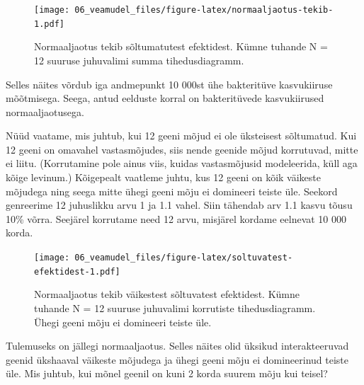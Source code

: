 \documentclass[]{book}
\newenvironment{Shaded}{\begin{snugshade}}{\end{snugshade}}
\newcommand{\DecValTok}[1]{\textcolor[rgb]{0.00,0.00,0.81}{#1}}
\newcommand{\FloatTok}[1]{\textcolor[rgb]{0.00,0.00,0.81}{#1}}
\newcommand{\KeywordTok}[1]{\textcolor[rgb]{0.13,0.29,0.53}{\textbf{#1}}}
\newcommand{\NormalTok}[1]{#1}
\newcommand{\OperatorTok}[1]{\textcolor[rgb]{0.81,0.36,0.00}{\textbf{#1}}}
\newcommand{\StringTok}[1]{\textcolor[rgb]{0.31,0.60,0.02}{#1}}
\begin{document}
\begin{figure}
\centering
\texttt{[image: 06\_veamudel\_files/figure-latex/normaaljaotus-tekib-1.pdf]}
\caption{\label{fig:normaaljaotus-tekib}Normaaljaotus tekib sõltumatutest efektidest. Kümne tuhande N = 12 suuruse juhuvalimi summa tihedusdiagramm.}
\end{figure}

Selles näites võrdub iga andmepunkt 10 000st ühe bakteritüve kasvukiiruse mõõtmisega. Seega, antud eelduste korral on bakteritüvede kasvukiirused normaaljaotusega.

Nüüd vaatame, mis juhtub, kui 12 geeni mõjud ei ole üksteisest sõltumatud. Kui 12 geeni on omavahel vastasmõjudes, siis nende geenide mõjud korrutuvad, mitte ei liitu. (Korrutamine pole ainus viis, kuidas vastasmõjusid modeleerida, küll aga kõige levinum.)
Kõigepealt vaatleme juhtu, kus 12 geeni on kõik väikeste mõjudega ning seega mitte ühegi geeni mõju ei domineeri teiste üle.
Seekord genreerime 12 juhuslikku arvu 1 ja 1.1 vahel.
Siin tähendab arv 1.1 kasvu tõusu 10\% võrra.
Seejärel korrutame need 12 arvu, misjärel kordame eelnevat 10 000 korda.



\begin{Shaded}
\end{Shaded}

\begin{figure}
\centering
\texttt{[image: 06\_veamudel\_files/figure-latex/soltuvatest-efektidest-1.pdf]}
\caption{\label{fig:soltuvatest-efektidest}Normaaljaotus tekib väikestest sõltuvatest efektidest. Kümne tuhande N = 12 suuruse juhuvalimi korrutiste tihedusdiagramm. Ühegi geeni mõju ei domineeri teiste üle.}
\end{figure}

Tulemuseks on jällegi normaaljaotus.
Selles näites olid üksikud interakteeruvad geenid ükshaaval väikeste mõjudega ja ühegi geeni mõju ei domineerinud teiste üle.
Mis juhtub, kui mõnel geenil on kuni 2 korda suurem mõju kui teisel?



\begin{Shaded}
\end{Shaded}
\end{document}
